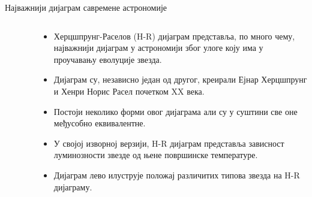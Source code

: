 \documentclass[aspectratio=169, xcolor=table, 10pt]{beamer}
\theoremstyle{definition}
\begin{document}
\begin{frame}{Најважнији дијаграм савремене астрономије}
  \begin{columns}[T]
    \begin{column}{0.45\textwidth}
      \begin{figure}
        \centering
        \vspace{-1em}
      \end{figure}
    \end{column}
    \begin{column}{0.55\textwidth}
      \begin{itemize}
        \item Херцшпрунг-Раселов (H-R) дијаграм представља, по много чему, најважнији дијаграм у астрономији због улоге коју има у проучавању еволуције звезда.
        \item Дијаграм су, независно један од другог, креирали Ејнар Херцшпрунг и Хенри Норис Расел почетком XX века\cite{mathias}.
        \item Постоји неколико форми овог дијаграма али су у суштини све оне међусобно еквивалентне.
        \item У својој изворној верзији, H-R дијаграм представља зависност луминозности звезде од њене површинске температуре.
        \item Дијаграм лево илуструје положај различитих типова звезда на H-R дијаграму.
      \end{itemize}
    \end{column}
  \end{columns}
\end{frame}
\end{document}
